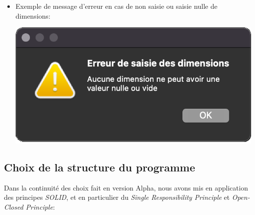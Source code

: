 \begin{itemize}
    \item Exemple de message d’erreur en cas de non saisie ou saisie nulle de dimensions:

          \begin{center}
              \includegraphics[scale=0.25]{images/betaErreurSaisie.png}
          \end{center}


\end{itemize}

\subsection{Choix de la structure du programme}

Dans la continuité des choix fait en version Alpha, nous avons mis en application des principes \emph{SOLID}, et en particulier du
\emph{Single Responsibility Principle} et \emph{Open-Closed Principle}:

